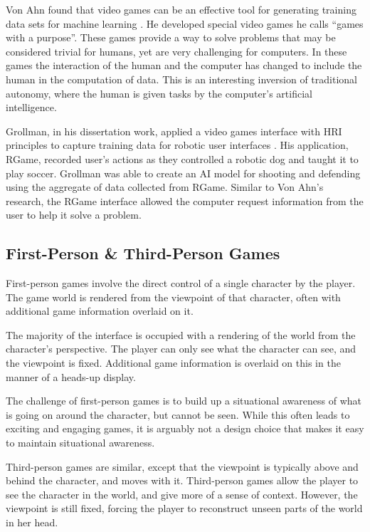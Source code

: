 Von Ahn found that video games can be an effective tool for generating training data sets for machine learning \cite{GWAP}. He developed special video games he calls ``games with a purpose''.  These games provide a way to solve problems that may be considered trivial for humans, yet are very challenging for computers. In these games the interaction of the human and the computer has changed to include the human in the computation of data. This is an interesting inversion of traditional autonomy, where the human is given tasks by the computer's artificial intelligence.


Grollman, in his dissertation work, applied a video games interface with HRI principles to capture training data for robotic user interfaces \cite{Grollman}. His application, RGame, recorded user’s actions as they controlled a robotic dog and taught it to play soccer. Grollman was able to create an AI model for shooting and defending using the aggregate of data collected from RGame. Similar to Von Ahn's research, the RGame interface allowed the computer request information from the user to help it solve a problem.

\subsection{First-Person \& Third-Person Games} %
\label{sub:first_person_games}
First-person games involve the direct control of a single character by the player. The game world is rendered from the viewpoint of that character, often with additional game information overlaid on it. 

The majority of the interface is occupied with a rendering of the world from the character’s perspective. The player can only see what the character can see, and the viewpoint is fixed. Additional game information is overlaid on this in the manner of a heads-up display.

The challenge of first-person games is to build up a situational awareness of what is going on around the character, but cannot be seen. While this often leads to exciting and engaging games, it is arguably not a design choice that makes it easy to maintain situational awareness.

Third-person games are similar, except that the viewpoint is typically above and behind the character, and moves with it. Third-person games allow the player to see the character in the world, and give more of a sense of context. However, the viewpoint is still fixed, forcing the player to reconstruct unseen parts of the world in her head.


